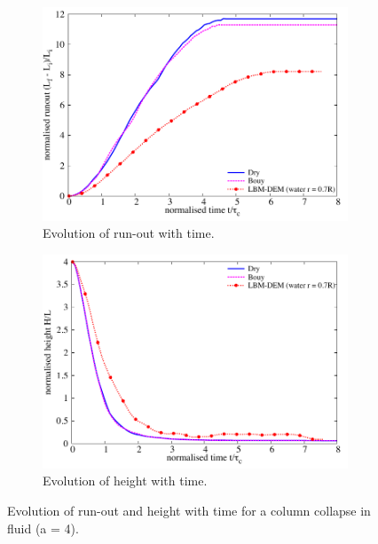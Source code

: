 \begin{figure}[htpb]
\centering
\begin{subfigure}[t]{0.9\textwidth}
\centering
\includegraphics[width=\textwidth]{Runout_a4f}
\caption{Evolution of run-out with time.}
\label{fig:Runout_a4f}
\end{subfigure}

\begin{subfigure}[t]{0.9\textwidth}
\centering
\includegraphics[width=\textwidth]{Height_a4f}
\caption{Evolution of height with time.}
\label{fig:Height_a4f}
\end{subfigure}
\caption{Evolution of run-out and height with time for a column collapse in 
fluid (a = 4).}
\label{fig:a4f}
\end{figure}


